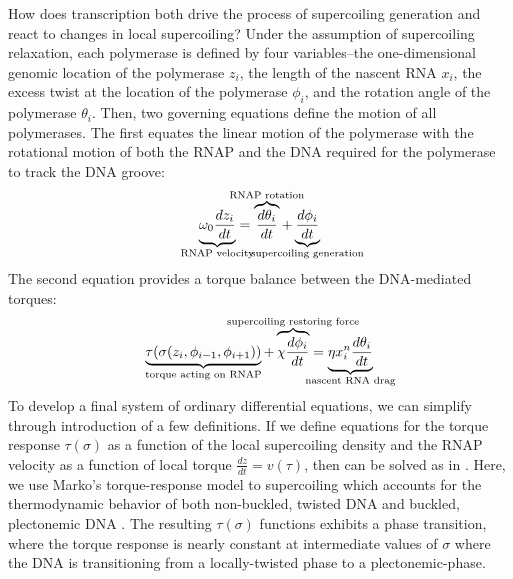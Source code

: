 \documentclass[11pt]{article}
\begin{document}
How does transcription both drive the process of supercoiling generation and react to changes in local supercoiling? Under the assumption of supercoiling relaxation, each polymerase is defined by four variables--the one-dimensional genomic location of the polymerase \(z_i\), the length of the nascent RNA \(x_i\), the excess twist at the location of the polymerase \(\phi_i\), and the rotation angle of the polymerase \(\theta_i\). Then, two governing equations define the motion of all polymerases. The first equates the linear motion of the polymerase with the rotational motion of both the RNAP and the DNA required for the polymerase to track the DNA groove:
\begin{equation}
    \underbrace{\omega_0 \frac{dz_i}{dt}}_{\mathclap{\text{RNAP velocity}}} = \overbrace{\frac{d\theta_i}{dt}}^{\mathclap{\text{RNAP rotation}}} + \underbrace{\frac{d\phi_i}{dt}}_{\mathclap{\text{supercoiling generation}}}
\label{eq:linear_rotational_balance}
\end{equation}
The second equation provides a torque balance between the DNA-mediated torques:
\begin{equation}
    \underbrace{\tau(\sigma(z_i, \phi_{i-1}, \phi_{i+1}))}_{\mathclap{\text{torque acting on RNAP}}} + \overbrace{\chi \frac{d\phi_i}{dt}}^{\mathclap{\text{supercoiling restoring force}}}= \underbrace{\eta x_i^n \frac{d\theta_i}{dt}}_{\mathclap{\text{nascent RNA drag}}}
\label{eq:torque_balance}
\end{equation}
To develop a final system of ordinary differential equations, we can simplify through introduction of a few definitions. If we define equations for the torque response \(\tau(\sigma)\) as a function of the local supercoiling density and the RNAP velocity as a function of local torque \(\frac{dz}{dt} = v(\tau)\), then  can be solved as in \textcite{sevierPropertiesGeneExpression2018}. Here, we use Marko's torque-response model to supercoiling which accounts for the thermodynamic behavior of both non-buckled, twisted DNA and buckled, plectonemic DNA \parencite{markoTorqueDynamicsLinking2007}. The resulting \(\tau(\sigma)\) functions exhibits a phase transition, where the torque response is nearly constant at intermediate values of \(\sigma\) where the DNA is transitioning from a locally-twisted phase to a plectonemic-phase.
\end{document}
